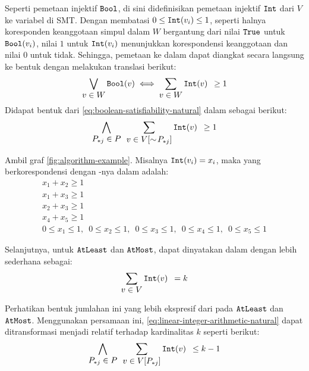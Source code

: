 Seperti pemetaan injektif \(\mathtt{Bool}\), di sini didefinisikan pemetaan injektif \(\mathtt{Int}\) dari \(V\) ke variabel  di SMT. Dengan membatasi \(0 \leq \mathtt{Int}(v_i) \leq 1\), seperti halnya koresponden keanggotaan simpul dalam \(W\) bergantung dari nilai \(\mathtt{True}\) untuk \(\mathtt{Bool}(v_i)\), nilai \(1\) untuk \(\mathtt{Int}(v_i)\) menunjukkan korespondensi keanggotaan dan nilai \(0\) untuk tidak. Sehingga, pemetaan  ke dalam  dapat diangkat secara langsung ke bentuk  dengan melakukan translasi berikut:
\[
	\bigvee \limits_{\displaystyle v \in W} \mathtt{Bool}(v)
	\iff
	\sum \limits_{\displaystyle v \in W} \mathtt{Int}(v) \enspace \geq 1
\]
Didapat bentuk dari \autoref{eq:boolean-satisfiability-natural} dalam  sebagai berikut:
\begin{equation}
	\bigwedge \limits_{\displaystyle P_{*j} \in P} \enspace \sum \limits_{\displaystyle v \in V[\sim\!P_{*j}]} \mathtt{Int}(v) \enspace \geq 1
	\label{eq:linear-integer-arithmetic-natural}
\end{equation}

\begin{example}
	Ambil graf \autoref{fig:algorithm-example}. Misalnya \(\mathtt{Int}(v_i) = x_i\), maka  yang berkorespondensi dengan -nya dalam  adalah:
	\[
		\begin{array}{c}
			x_1 + x_2 \geq 1 \\
			x_1 + x_3 \geq 1 \\
			x_2 + x_3 \geq 1 \\
			x_4 + x_5 \geq 1 \\ [4pt]
			0 \leq x_1 \leq 1,\enspace
			0 \leq x_2 \leq 1,\enspace
			0 \leq x_3 \leq 1,\enspace
			0 \leq x_4 \leq 1,\enspace
			0 \leq x_5 \leq 1
		\end{array}
	\]
\end{example}

Selanjutnya, untuk  \(\mathtt{AtLeast}\) dan \(\mathtt{AtMost}\), dapat dinyatakan dalam  dengan lebih sederhana sebagai:
\begin{equation}
	\sum \limits_{\displaystyle v \in V} \mathtt{Int}(v) \enspace = k
	\label{eq:linear-integer-arithmetic-cardinality}
\end{equation}

Perhatikan bentuk jumlahan ini yang lebih ekspresif dari pada \(\mathtt{AtLeast}\) dan \(\mathtt{AtMost}\). Menggunakan persamaan ini, \autoref{eq:linear-integer-arithmetic-natural} dapat ditransformasi menjadi relatif terhadap kardinalitas \(k\) seperti berikut:
\begin{equation}
	\bigwedge \limits_{\displaystyle P_{*j} \in P} \enspace \sum \limits_{\displaystyle v \in V[P_{*j}]} \mathtt{Int}(v) \enspace \leq k - 1
	\label{eq:linear-integer-arithmetic}
\end{equation}

